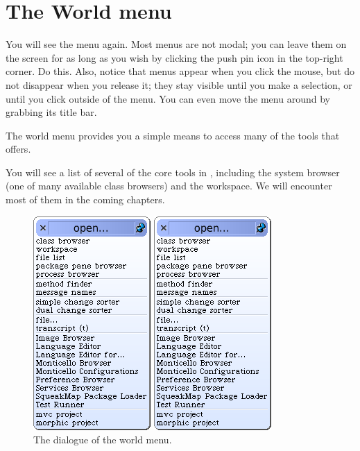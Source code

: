 \documentclass[a4paper,10pt,twoside]{book}
\begin{document}
\section{The World menu}

You will see the  menu again.
Most \sq menus are not modal; you can leave them on the screen for as long as you wish by clicking the push pin icon in the top-right corner. Do this. Also, notice that menus appear when you click the mouse, but do not disappear when you release it; they stay visible until you make a selection, or until you click outside of the menu. You can even move the menu around by grabbing its title bar.

The world menu provides you a simple means to access many of the tools that \sq offers.

You will see a list of several of the core tools in \sq, including the system browser (one of many available class browsers) and the workspace.
We will encounter most of them in the coming chapters.

\begin{figure}[htb]
\ifluluelse
	{\centerline {\includegraphics[scale=0.5]{OpenMenu}}}
	{\centerline {\includegraphics[scale=0.7]{OpenMenu}}}
\caption{The  dialogue of the world menu.\label{fig:openmenu}}
\end{figure}
\end{document}
